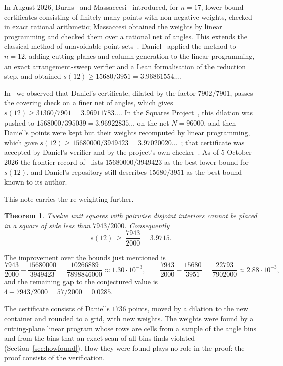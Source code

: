 \documentclass[11pt]{amsart}
\newtheorem{theorem}{Theorem}[section]
\theoremstyle{definition}
\theoremstyle{remark}
\newcommand{\sfrac}{7943/2000}          %
\newcommand{\sdfrac}{\frac{7943}{2000}}
\newcommand{\sdec}{3.9715}
\begin{document}
In August 2026, Burns~\cite{Bur26} and Massaccesi~\cite{Mas26a,Mas26b} introduced, for $n=17$, lower-bound certificates consisting of finitely many points with non-negative weights, checked in exact rational arithmetic; Massaccesi obtained the weights by linear programming and checked them over a rational net of angles. This extends the classical method of unavoidable point sets~\cite{Gob79,Str03}. Daniel~\cite{Dan26} applied the method to $n=12$, adding cutting planes and column generation to the linear programming, an exact arrangement-sweep verifier and a Lean formalisation of the reduction step, and obtained $s(12)\ge 15680/3951 = 3.96861554\ldots$.

In~\cite{Ryu26} we observed that Daniel's certificate, dilated by the factor $7902/7901$, passes the covering check on a finer net of angles, which gives $s(12)\ge 31360/7901 = 3.96911783\ldots$. In the Squares Project~\cite{Lev26}, this dilation was pushed to $1568000/395039 = 3.96922835\ldots$ on the net $N=96000$, and then Daniel's points were kept but their weights recomputed by linear programming, which gave $s(12)\ge 15680000/3949423=3.97020020\ldots$~\cite{Lev26b}; that certificate was accepted by Daniel's verifier and by the project's own checker~\cite{Lev26c}. As of 5 October 2026 the frontier record of~\cite{Lev26} lists $15680000/3949423$ as the best lower bound for $s(12)$, and Daniel's repository still describes $15680/3951$ as the best bound known to its author.

This note carries the re-weighting further.

\begin{theorem}\label{thm:main}
Twelve unit squares with pairwise disjoint interiors cannot be placed in a square of side less than $\sfrac$. Consequently
\[
  s(12)\ \ge\ \sdfrac = \sdec .
\]
\end{theorem}

The improvement over the bounds just mentioned is
\[
  \sdfrac-\frac{15680000}{3949423}=\frac{10266889}{7898846000}\approx 1.30\cdot10^{-3},
  \qquad
  \sdfrac-\frac{15680}{3951}=\frac{22793}{7902000}\approx 2.88\cdot10^{-3},
\]
and the remaining gap to the conjectured value is $4-\sfrac = 57/2000 = 0.0285$.

The certificate consists of Daniel's $1736$ points, moved by a dilation to the new container and rounded to a grid, with new weights. The weights were found by a cutting-plane linear program whose rows are cells from a sample of the angle bins and from the bins that an exact scan of all bins finds violated (Section~\ref{sec:howfound}). How they were found plays no role in the proof: the proof consists of the verification.
\end{document}
